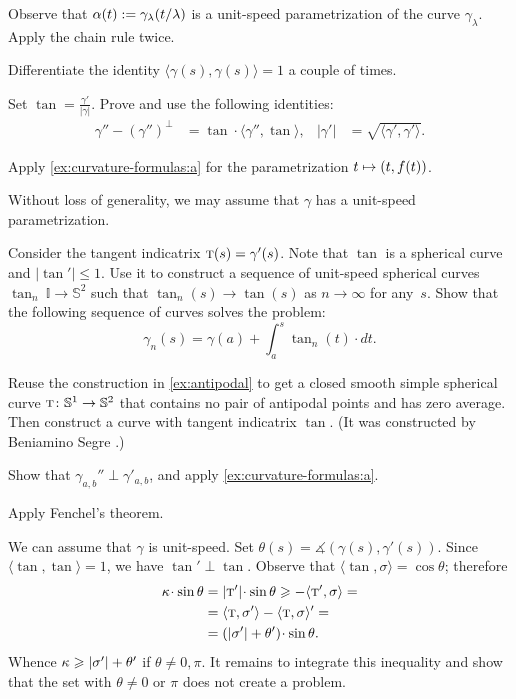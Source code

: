 \begin{multicols}{2}
Observe that $\alpha(t)\mathrel{:=}\gamma_{\lambda}(t/\lambda)$ is a unit-speed parametrization of the curve $ \gamma_{\lambda}$.
Apply the chain rule twice.


 Differentiate the identity $\langle\gamma(s),\gamma(s)\rangle=1$ a couple of times.

Set $\tan=\tfrac{\gamma'}{|\gamma|}$.
Prove and use the following identities: 
\begin{align*}
\gamma''-(\gamma'')^\perp&=\tan\cdot\langle\gamma'',\tan\rangle,
&
|\gamma'|&=\sqrt{\langle \gamma',\gamma'\rangle}.
\end{align*}

Apply \ref{ex:curvature-formulas:a} for the parametrization $t\z\mapsto (t,f(t))$.

Without loss of generality, we may assume that $\gamma$ has a unit-speed parametrization.

Consider the tangent indicatrix $\tan(s)\z=\gamma'(s)$.
Note that $\tan$ is a spherical curve and $|\tan'|\le 1$.
Use it to construct a sequence of unit-speed spherical curves $\tan_n\:\mathbb{I}\to\mathbb{S}^2$ such that $\tan_n(s)\to \tan(s)$ as $n\to\infty$ for any~$s$.
Show that the following sequence of curves solves the problem:
\[\gamma_n(s)=\gamma(a)+\int_a^s\tan_n(t)\cdot dt.\]

Reuse the construction in \ref{ex:antipodal} to get a closed smooth simple spherical curve $\tan\:\mathbb{S}^1\z\to\mathbb{S}^2$ that contains no pair of antipodal points and has zero average.
Then construct a curve with tangent indicatrix $\tan$.
(It was constructed by Beniamino Segre \cite{segre}.)

Show that $\gamma_{a,b}''\perp \gamma'_{a,b}$, and apply \ref{ex:curvature-formulas:a}.

 Apply Fenchel's theorem.

We can assume that $\gamma$ is unit-speed.
Set $\theta(s)=\measuredangle(\gamma(s),\gamma'(s))$.
Since $\langle\tan,\tan\rangle=1$, we have $\tan'\perp \tan$.
Observe that $\langle \tan,\sigma\rangle=\cos\theta$;
therefore
\begin{align*}
\kur\cdot \sin\theta
&=|\tan'|\cdot \sin\theta\ge
-\langle \tan',\sigma\rangle=
\\
&=
\langle \tan,\sigma'\rangle-\langle \tan,\sigma\rangle'=
\\
&=
(|\sigma'|+\theta')\cdot \sin\theta.
\end{align*}
Whence $\kappa\geqslant |\sigma'|+\theta'$
if $\theta\ne0,\pi$.
It remains to integrate this inequality and show that the set with $\theta\ne0$ or $\pi$ does not create a problem.


\end{multicols}
